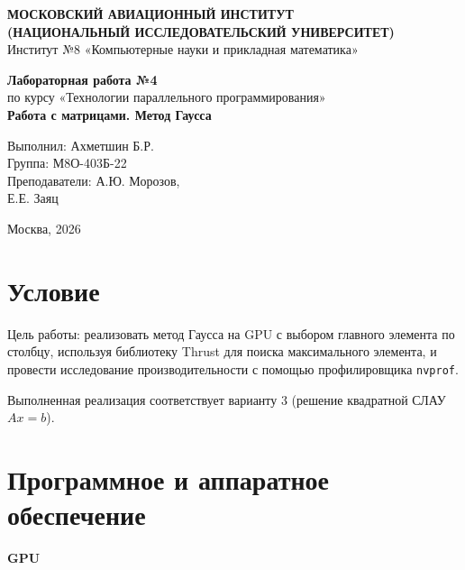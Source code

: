 \documentclass[a4paper,14pt]{extarticle}
\begin{document}
\begin{titlepage}
\begin{center}
\textbf{МОСКОВСКИЙ АВИАЦИОННЫЙ ИНСТИТУТ}\\
\textbf{(НАЦИОНАЛЬНЫЙ ИССЛЕДОВАТЕЛЬСКИЙ УНИВЕРСИТЕТ)}\\
Институт №8 «Компьютерные науки и прикладная математика»
\end{center}

\vspace{3.5cm}
\begin{center}
\textbf{\Large Лабораторная работа №4}\\
\vspace{0.3cm}
по курсу «Технологии параллельного программирования»\\
\vspace{0.8cm}
\textbf{Работа с матрицами. Метод Гаусса}
\end{center}

\vspace{4cm}
\begin{flushright}
Выполнил: Ахметшин Б.Р.\\
Группа: М8О-403Б-22\\
Преподаватели: А.Ю. Морозов,\\
\hspace*{3.6cm} Е.Е. Заяц
\end{flushright}

\vfill
\begin{center}
Москва, 2026
\end{center}
\end{titlepage}

\section*{Условие}
Цель работы: реализовать метод Гаусса на GPU с выбором главного элемента по столбцу,
используя библиотеку Thrust для поиска максимального элемента, и провести исследование
производительности с помощью профилировщика \texttt{nvprof}.

Выполненная реализация соответствует варианту 3 (решение квадратной СЛАУ
\(Ax=b\)).

\section*{Программное и аппаратное обеспечение}
\textbf{GPU}
\end{document}
